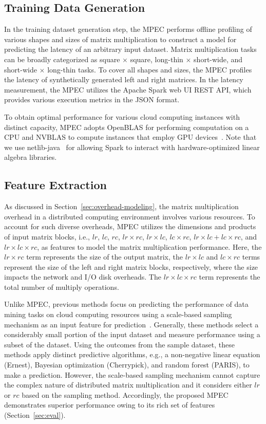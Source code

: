 \documentclass[10pt, conference, compsocconf]{IEEEtran}
\begin{document}
\subsection{Training Data Generation}\label{sec:train-data}
In the training dataset generation step, the MPEC performs offline profiling of various shapes and sizes of matrix multiplication to construct a model for predicting the latency of an arbitrary input dataset. Matrix multiplication tasks can be broadly categorized as square $\times$ square, long-thin $\times$ short-wide, and short-wide $\times$ long-thin tasks. To cover all shapes and sizes, the MPEC profiles the latency of synthetically generated left and right matrices. In the latency measurement, the MPEC utilizes the Apache Spark web UI REST API, which provides various execution metrics in the JSON format.

To obtain optimal performance for various cloud computing instances with distinct capacity, MPEC adopts OpenBLAS for performing computation on a CPU and NVBLAS to compute instances that employ GPU devices~\cite{NVBLAS}. Note that we use netlib-java~\cite{fatman-littleboy} for allowing Spark to interact with hardware-optimized linear algebra libraries.

\subsection{Feature Extraction}\label{sec:features}
As discussed in Section~\ref{sec:overhead-modeling}, the matrix multiplication overhead in a distributed computing environment involves various resources. To account for such diverse overheads, MPEC utilizes the dimensions and products of input matrix blocks, i.e., $lr$, $lc$, $rc$, $lr \times rc$, $lr \times lc$, $lc \times rc$, $lr \times lc + lc \times rc$, and $lr \times lc \times rc$, as features to model the matrix multiplication performance. Here, the $lr \times rc$ term represents the size of the output matrix, the $lr \times lc$ and $lc \times rc$ terms represent the size of the left and right matrix blocks, respectively, where the size impacts the network and I/O disk overheads. The $lr \times lc \times rc$ term represents the total number of multiply operations.

Unlike MPEC, previous methods focus on predicting the performance of data mining tasks on cloud computing resources using a scale-based sampling mechanism as an input feature for prediction~\cite{cherrypick, ernest, paris}. Generally, these methods select a considerably small portion of the input dataset and measure performance using a subset of the dataset. Using the outcomes from the sample dataset, these methods apply distinct predictive algorithms, e.g., a non-negative linear equation (Ernest), Bayesian optimization (Cherrypick), and random forest (PARIS), to make a prediction. However, the scale-based sampling mechanism cannot capture the complex nature of distributed matrix multiplication and it considers either $lr$ or $rc$ based on the sampling method. Accordingly, the proposed MPEC demonstrates superior performance owing to its rich set of features (Section~\ref{sec:eval}).
\end{document}
